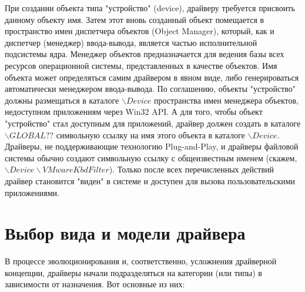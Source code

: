 \documentclass[14pt,a4paper]{article}
\begin{document}
\par При создании объекта типа "устройство" (device), драйверу требуется присвоить данному объекту имя. Затем этот вновь созданный объект помещается в пространство имен диспетчера объектов (Object Manager), который, как и диспетчер (менеджер) ввода-вывода, является частью исполнительной подсистемы ядра. Менеджер объектов предназначается для ведения базы всех ресурсов операционной системы, представленных в качестве объектов. Имя объекта может определяться самим драйвером в явном виде, либо генерироваться автоматически менеджером ввода-вывода. По соглашению, объекты "устройство" должны размещаться в каталоге \begin{math} \backslash Device \end{math} пространства имен менеджера объектов, недоступном приложениям через Win32 API. А для того, чтобы объект "устройство" стал доступным для приложений, драйвер должен создать в каталоге \begin{math} \backslash GLOBAL?? \end{math} символьную ссылку на имя этого объекта в каталоге \begin{math} \backslash Device \end{math}. Драйверы, не поддерживающие технологию Plug-and-Play, и драйверы файловой системы обычно создают символьную ссылку с общеизвестным именем (скажем,  \begin{math} \backslash Device \backslash VMwareKbdFilter \end{math}). Только после всех перечисленных действий драйвер становится "виден" в системе и доступен для вызова пользовательскими приложениями.

\section{Выбор вида и модели драйвера}
\par В процессе эволюционирования и, соответственно, усложнения драйверной концепции, драйверы начали подразделяться на категории (или типы) в зависимости от назначения. Вот основные из них:
\end{document}
